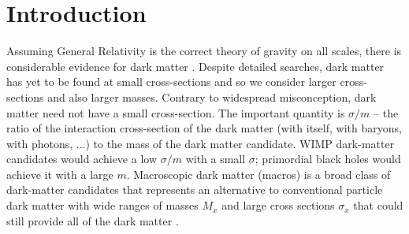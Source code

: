 \documentclass[%
 reprint,
 amsmath,amssymb,
 aps,
]{revtex4-2}
\begin{document}
\maketitle


\section{Introduction} %
\label{sec:introduction}

    Assuming General Relativity is the correct theory of gravity on all scales, there is considerable evidence for dark matter \citep{Tanabashi2018}. Despite detailed searches, dark matter has yet to be found at small cross-sections and so we consider larger cross-sections and also larger masses.
   Contrary to widespread misconception, dark matter need not have a small cross-section. The important quantity is $\sigma/m$ -- the ratio of the interaction cross-section of the dark matter (with itself, with baryons, with photons, ...) to the mass of the dark matter candidate.  WIMP dark-matter candidates would achieve a low $\sigma/m$ with a small $\sigma$; primordial black holes would achieve it with a large $m$.
    Macroscopic dark matter (macros) is a broad class of dark-matter candidates that represents an alternative to conventional particle dark matter with wide ranges of masses $M_x$ and large cross sections $\sigma_x$ that could still provide all of the dark matter \citep{jacobs2015macro}.
\end{document}
